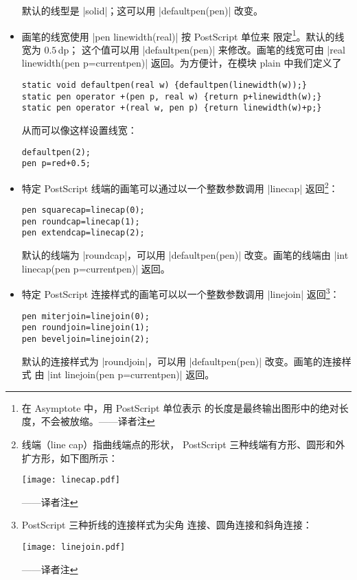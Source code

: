 \documentclass[nofonts,CJKnormalspaces]{ctexbook}[2009/05/20]
\newcommand*\prgname[1]{\textsf{#1}}
\newcommand\transnote[1]{\footnote{#1——译者注}}
\begin{document}
\begin{itemize}
  默认的线型是 |solid|；这可以用 |defaultpen(pen)| 改变。

\item 画笔的线宽使用 |pen linewidth(real)| 按 \prgname{PostScript} 单位来
  限定\transnote{在 \prgname{Asymptote} 中，用 \prgname{PostScript} 单位表示
  的长度是最终输出图形中的绝对长度，不会被放缩。}。默认的线宽为 $0.5$\,dp；
  这个值可以用 |defaultpen(pen)| 来修改。画笔的线宽可由
  |real linewidth(pen p=currentpen)| 返回。为方便计，在模块 \prgname{plain}
  中我们定义了
\begin{lstlisting}
static void defaultpen(real w) {defaultpen(linewidth(w));}
static pen operator +(pen p, real w) {return p+linewidth(w);}
static pen operator +(real w, pen p) {return linewidth(w)+p;}
\end{lstlisting}
  从而可以像这样设置线宽：
\begin{lstlisting}
defaultpen(2);
pen p=red+0.5;
\end{lstlisting}

\item 特定 \prgname{PostScript} 线端的画笔可以通过以一个整数参数调用
  |linecap| 返回\transnote{线端（line cap）指曲线端点的形状，
  \prgname{PostScript} 三种线端有方形、圆形和外扩方形，如下图所示：
  \begin{center}\texttt{[image: linecap.pdf]}\end{center}}：
\begin{lstlisting}
pen squarecap=linecap(0);
pen roundcap=linecap(1);
pen extendcap=linecap(2);
\end{lstlisting}
  默认的线端为 |roundcap|，可以用 |defaultpen(pen)| 改变。画笔的线端由
  |int linecap(pen p=currentpen)| 返回。

\item 特定 \prgname{PostScript} 连接样式的画笔可以以一个整数参数调用
  |linejoin| 返回\transnote{\prgname{PostScript} 三种折线的连接样式为尖角
  连接、圆角连接和斜角连接：\begin{center}\texttt{[image: linejoin.pdf]}\end{center}}：
\begin{lstlisting}
pen miterjoin=linejoin(0);
pen roundjoin=linejoin(1);
pen beveljoin=linejoin(2);
\end{lstlisting}
  默认的连接样式为 |roundjoin|，可以用 |defaultpen(pen)| 改变。画笔的连接样式
  由 |int linejoin(pen p=currentpen)| 返回。


\end{itemize}
\end{document}

